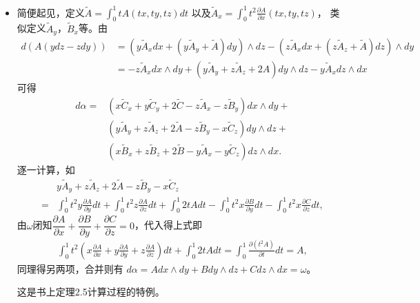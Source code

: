 \begin{itemize}
\item[24.] 
简便起见，定义$\tilde{A}=\displaystyle{\int_{0}^{1}tA(tx,ty,tz)dt}$
以及$\tilde{A}_{x}=\displaystyle{\int_{0}^{1}t^{2}\frac{\partial A}{\partial x}(tx,ty,tz)}$，
类似定义$\tilde{A}_{y}$，$\tilde{B}_{x}$等。由
\begin{equation*}\begin{aligned}
d(A(ydz-zdy))
&= (y\tilde{A}_{x}dx+(y\tilde{A}_{y}+\tilde{A})dy)\wedge dz - (z\tilde{A}_{x}dx+(z\tilde{A}_{z}+\tilde{A})dz)\wedge dy \\
&= -z\tilde{A}_{x}dx \wedge dy + (y\tilde{A}_{y}+z\tilde{A}_{z}+2A)dy \wedge dz - y\tilde{A}_{x}dz \wedge dx
\end{aligned}\end{equation*}
可得
\begin{equation*}\begin{aligned}
d\alpha =& 
(x\tilde{C}_{x} + y\tilde{C}_{y} + 2\tilde{C} - z\tilde{A}_{x} - z\tilde{B}_{y})dx \wedge dy + 
\\&(y\tilde{A}_{y} + z\tilde{A}_{z} + 2\tilde{A} - z\tilde{B}_{y} - x\tilde{C}_{z})dy \wedge dz + 
\\&(x\tilde{B}_{x} + z\tilde{B}_{z} + 2\tilde{B} - y\tilde{A}_{x} - y\tilde{C}_{z})dz \wedge dx.
\end{aligned}\end{equation*}
逐一计算，如
\begin{equation*}\begin{aligned}
&y\tilde{A}_{y} + z\tilde{A}_{z} + 2\tilde{A} - z\tilde{B}_{y} - x\tilde{C}_{z} \\
=&\int_{0}^{1} t^{2}y\frac{\partial A}{\partial y}dt
+\int_{0}^{1} t^{2}z\frac{\partial A}{\partial z}dt
+\int_{0}^{1}2tAdt
-\int_{0}^{1} t^{2}x\frac{\partial B}{\partial y}dt
-\int_{0}^{1} t^{2}x\frac{\partial C}{\partial z}dt,
\end{aligned}\end{equation*}
由$\omega$闭知$\dfrac{\partial A}{\partial x}+\dfrac{\partial B}{\partial y}+\dfrac{\partial C}{\partial z}=0$，代入得上式即
\begin{equation*}\begin{aligned}
\int_{0}^{1} t^{2}(x\frac{\partial A}{\partial x}+y\frac{\partial A}{\partial y}+z\frac{\partial A}{\partial z})dt
+\int_{0}^{1}2tAdt
=\int_{0}^{1}\frac{\partial(t^{2}A)}{\partial t}dt = A,
\end{aligned}\end{equation*}
同理得另两项，合并则有
$d\alpha = Adx \wedge dy + Bdy \wedge dz + Cdz \wedge dx = \omega$。
\begin{remark}
    这是书上定理2.5计算过程的特例。
\end{remark}

\end{itemize}